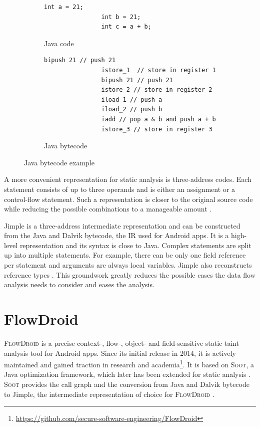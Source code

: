 \documentclass[../draft.tex]{subfiles}
\begin{document}
    \begin{figure}[ht]
        \centering
        \begin{subfigure}[b]{0.45\textwidth}
            \centering
            \begin{lstlisting}[gobble=16]
                int a = 21;
                int b = 21;
                int c = a + b;
            \end{lstlisting}
            \caption{Java code}
            \label{lst:jvmstack_a}
        \end{subfigure}
        \hfill
        \begin{subfigure}[b]{0.45\textwidth}
            \centering
            \begin{lstlisting}[gobble=16]
                bipush 21 // push 21
                istore_1  // store in register 1    
                bipush 21 // push 21
                istore_2 // store in register 2
                iload_1 // push a
                iload_2 // push b
                iadd // pop a & b and push a + b
                istore_3 // store in register 3
            \end{lstlisting}
            \caption{Java bytecode}
            \label{lst:jvmstack_b}
        \end{subfigure}
        \caption{Java bytecode example}
        \label{lst:jvmstack}
    \end{figure}

    A more convenient representation for static analysis is three-address codes. Each statement consists of up to three operands and is either an assignment or a control-flow statement. Such a representation is closer to the original source code while reducing the possible combinations to a manageable amount \cite{Aho1986}.

    Jimple is a three-address intermediate representation and can be constructed from the Java and Dalvik bytecode, the IR used for Android apps. It is a high-level representation and its syntax is close to Java. Complex statements are split up into multiple statements. For example, there can be only one field reference per statement and arguments are always local variables. Jimple also reconstructs reference types \cite{Valleerai2004}. This groundwork greatly reduces the possible cases the data flow analysis needs to consider and eases the analysis.

    \section{FlowDroid}\label{s:flowdroid}
    \textsc{FlowDroid} is a precise context-, flow-, object- and field-sensitive static taint analysis tool for Android apps\cite{Arzt2014}. Since its initial release in 2014, it is actively maintained and gained traction in research and academia\footnote{\url{https://github.com/secure-software-engineering/FlowDroid}}. It is based on \textsc{Soot}, a Java optimization framework, which later has been extended for static analysis \cite{Lam2011}. \textsc{Soot} provides the call graph and the conversion from Java and Dalvik bytecode to Jimple, the intermediate representation of choice for \textsc{FlowDroid} \cite{Arzt2017PhD}.
\end{document}
